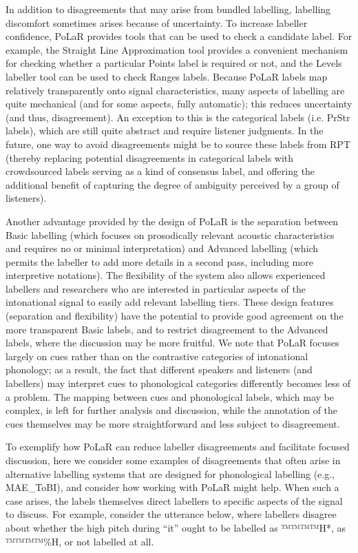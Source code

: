 \documentclass[11pt, twoside]{memoir}
\begin{document}
In addition to disagreements that may arise from bundled labelling, labelling discomfort sometimes arises because of uncertainty.  To increase labeller confidence, PoLaR provides tools that can be used to check a candidate label.  For example, the Straight Line Approximation tool provides a convenient mechanism for checking whether a particular Points label is required or not, and the Levels labeller tool can be used to check Ranges labels.  Because PoLaR labels map relatively transparently onto signal characteristics, many aspects of labelling are quite mechanical (and for some aspects, fully automatic); this reduces uncertainty (and thus, disagreement). An exception to this is the categorical labels (i.e. PrStr labels), which are still quite abstract and require listener judgments. In the future, one way to avoid disagreements might be to source these labels from RPT (thereby replacing potential disagreements in categorical labels with crowdsourced labels serving as a kind of consensus label, and offering the additional benefit of capturing the degree of ambiguity perceived by a group of listeners). 

Another advantage provided by the design of PoLaR is the separation between Basic labelling (which focuses on prosodically relevant acoustic characteristics and requires no or minimal interpretation) and Advanced labelling (which permits the labeller to add more details in a second pass, including more interpretive notations). The flexibility of the system also allows experienced labellers and researchers who are interested in particular aspects of the intonational signal to easily add relevant labelling tiers.  These design features (separation and flexibility) have the potential to provide good agreement on the more transparent Basic labels, and to restrict disagreement to the Advanced labels, where the discussion may be more fruitful.  We note that PoLaR focuses largely on cues rather than on the contrastive categories of intonational phonology; as a result, the fact that different speakers and listeners (and labellers) may interpret cues to phonological categories differently becomes less of a problem.  The mapping between cues and phonological labels, which may be complex, is left for further analysis and discussion, while the annotation of the cues themselves may be more straightforward and less subject to disagreement.

To exemplify how PoLaR can reduce labeller disagreements and facilitate focused discussion, here we consider some examples of disagreements that often arise in alternative labelling systems that are designed for phonological labelling (e.g., MAE\_ToBI), and consider how working with PoLaR might help. When such a case arises, the labels themselves direct labellers to specific aspects of the signal to discuss. For example, consider the utterance below, where labellers disagree about whether the high pitch during “it” ought to be labelled as ™™™™{H*}, as ™™™™{\%H}, or not labelled at all.
\end{document}
